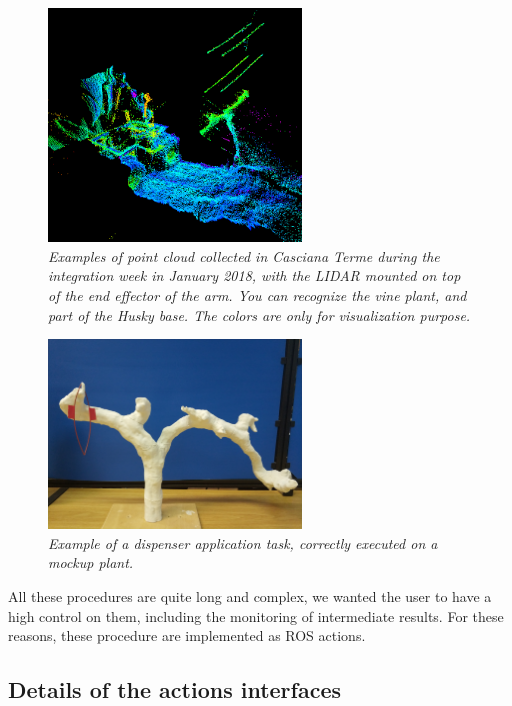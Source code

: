 \begin{figure}
	\centering
	\includegraphics[width=0.6\textwidth]{Images/grape_sw_hw_architecture/scanPoints.png}
	\caption{\textit{Examples of point cloud collected in Casciana Terme during the integration week in January 2018, with the \ac{LIDAR} mounted on top of the end effector of the arm. You can recognize the vine plant, and part of the Husky base. The colors are only for visualization purpose.}}
	\label{fig:pointCloudScanned}
\end{figure}

\begin{figure}
	\centering
	\includegraphics[width=0.6\textwidth]{Images/grape_sw_hw_architecture/deployOnMockup.jpg}
	\caption{\textit{Example of a dispenser application task, correctly executed on a mockup plant.}}
	\label{fig:deploymentOnMockup}
\end{figure}

All these procedures are quite long and complex, we wanted the user to have a high control on them, including the monitoring of intermediate results. For these reasons, these procedure are implemented as \ac{ROS} actions. 



\subsection{Details of the actions interfaces}

